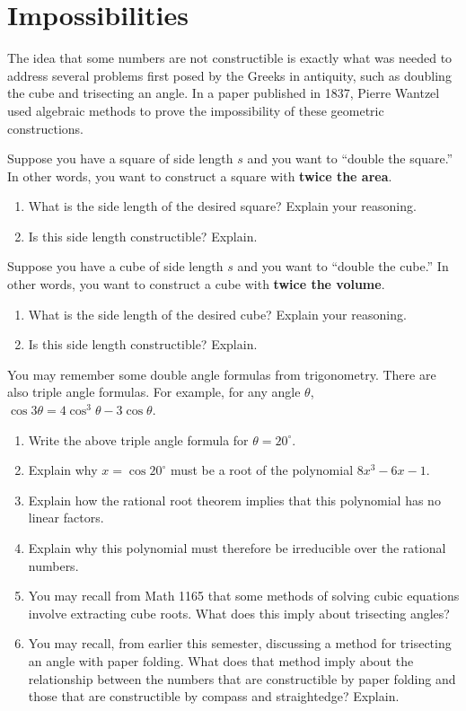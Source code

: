\newpage
\section{Impossibilities}

The idea that some numbers are not constructible is exactly what was needed to address several problems first posed by the Greeks in antiquity, such as doubling the cube and trisecting an angle.  In a paper published in 1837, Pierre Wantzel used algebraic methods to prove the impossibility of these geometric constructions.  

\begin{prob}
Suppose you have a square of side length $s$ and you want to ``double the square.''  In other words, you want to construct a square with \textbf{twice the area}.  
\begin{enumerate}
\item What is the side length of the desired square?  Explain your reasoning. 
\item Is this side length constructible?  Explain.  
\end{enumerate}
\end{prob}

\begin{prob}
Suppose you have a cube of side length $s$ and you want to ``double the cube.''  In other words, you want to construct a cube with \textbf{twice the volume}.  
\begin{enumerate}
\item What is the side length of the desired cube?  Explain your reasoning. 
\item Is this side length constructible?  Explain.  
\end{enumerate}
\end{prob}

\begin{prob}
You may remember some double angle formulas from trigonometry.  There are also triple angle formulas.  For example, for any angle $\theta$,  
$\cos3\theta=4\cos^3\theta -3\cos\theta$.  
\begin{enumerate}
\item Write the above triple angle formula for $\theta = 20^\circ$.  %
\item Explain why $x = \cos20^\circ$ must be a root of the polynomial $8x^3-6x-1$.  
\item Explain how the rational root theorem implies that this polynomial has no linear factors.  
\item Explain why this polynomial must therefore be irreducible over the rational numbers.  
\item You may recall from Math 1165 that some methods of solving cubic equations involve extracting cube roots.  What does this imply about trisecting angles?  
\item You may recall, from earlier this semester, discussing a method for trisecting an angle with paper folding.  What does that method imply about the relationship between the numbers that are constructible by paper folding and those that are constructible by compass and straightedge?  Explain.  
\end{enumerate}
\end{prob}
